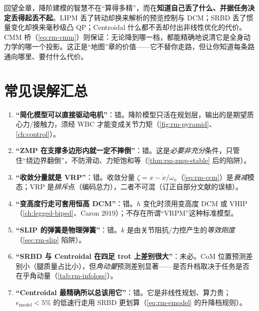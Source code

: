 \begin{insight}
回望全章，降阶建模的智慧不在“算得多精”，而在\textbf{知道自己丢了什么、并据任务决定丢得起丢不起}。LIPM 丢了转动却换来解析的预览控制与 DCM；SRBD 丢了惯量变化却换来毫秒级凸 QP；Centroidal 什么都不丢却付出非线性优化的代价。CMM 桥（\cref{eq:rm-cmm}）则保证：无论降到哪一档，都能精确地说清它是全身动力学的哪一个投影。这正是“地图”章的价值——它不替你走路，但让你知道每条路通向哪里、要付什么代价。
\end{insight}

\section*{常见误解汇总}
\begin{enumerate}
  \item \textbf{“简化模型可以直接驱动电机”}：错。降阶模型只活在规划层，输出的是期望质心力/接触力，须经 WBC 才能变成关节力矩（\cref{fig:rm-pyramid}、\cref{ch:control}）。
  \item \textbf{“ZMP 在支撑多边形内就一定不摔倒”}：错。这是\emph{必要非充分}条件，只管住“绕边界翻倒”，不防滑动、力矩饱和等（\cref{thm:rm-zmp-stable} 后的陷阱）。
  \item \textbf{“收敛分量就是 VRP”}：错。收敛分量 $\zeta=x-\dot{x}/\omega_n$（\cref{eq:rm-ccm}）是\emph{衰减}模态；VRP 是\emph{排斥}点（编码总力），二者不可混（订正自部分文献的误植）。
  \item \textbf{“变高度行走可套用恒高 DCM”}：错。$h$ 变化时须用变高度 DCM 或 VHIP（\cref{ch:legged-biped}、Caron 2019\cite{caron2019capturability}）；不存在所谓“VRPM”这种标准模型。
  \item \textbf{“SLIP 的弹簧是物理弹簧”}：错。$k$ 是由关节阻抗/力控产生的\emph{等效刚度}（\cref{sec:rm-slip} 陷阱）。
  \item \textbf{“SRBD 与 Centroidal 在四足 trot 上差别很大”}：未必。CoM 位置预测差别小（腿质量占比小），但\emph{角动量}预测差别显著——是否升档取决于任务是否在乎角动量（\cref{tab:rm-infoloss}）。
  \item \textbf{“Centroidal 最精确所以总该用它”}：错。它是非线性规划、算力贵；$e_{\mathrm{model}}<5\%$ 的低速行走用 SRBD 更划算（\cref{eq:rm-emodel} 的升降档规则）。
\end{enumerate}

